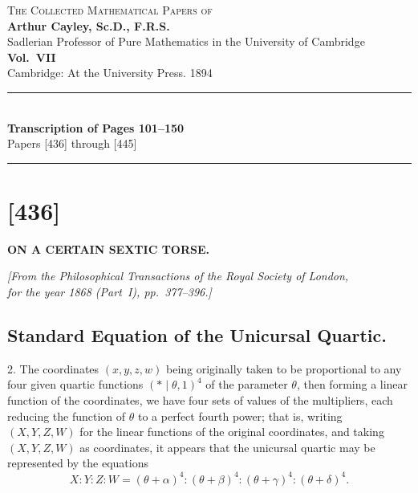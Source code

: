 \documentclass[11pt,a4paper]{article}
\begin{document}
\begin{titlepage}
\begin{center}
\vspace*{2cm}
{\Large\textsc{The Collected Mathematical Papers of}}\\[0.5em]
{\LARGE\textbf{Arthur Cayley, Sc.D., F.R.S.}}\\[0.3em]
{\large Sadlerian Professor of Pure Mathematics in the University of Cambridge}\\[2cm]
{\Huge\textbf{Vol.\ VII}}\\[1cm]
{\large Cambridge: At the University Press. 1894}\\[2cm]
\rule{\textwidth}{0.4pt}\\[1cm]
{\Large\textbf{Transcription of Pages 101--150}}\\[0.5em]
{\normalsize Papers [436] through [445]}\\[1cm]
\rule{\textwidth}{0.4pt}
\end{center}
\end{titlepage}

\tableofcontents
\newpage

\section*{[436]}

\begin{center}
\textbf{\Large ON A CERTAIN SEXTIC TORSE.}
\end{center}

\begin{flushright}
\textit{[From the Philosophical Transactions of the Royal Society of London,}\\
\textit{for the year 1868 (Part\ I), pp.\ 377--396.]}
\end{flushright}

\vspace{1em}

\subsection*{Standard Equation of the Unicursal Quartic.}

2. The coordinates $(x, y, z, w)$ being originally taken to be proportional to any four given quartic functions $(\ast\mid\theta, 1)^4$ of the parameter $\theta$, then forming a linear function of the coordinates, we have four sets of values of the multipliers, each reducing the function of $\theta$ to a perfect fourth power; that is, writing $(X, Y, Z, W)$ for the linear functions of the original coordinates, and taking $(X, Y, Z, W)$ as coordinates, it appears that the unicursal quartic may be represented by the equations
\[
X : Y : Z : W = (\theta + \alpha)^4 : (\theta + \beta)^4 : (\theta + \gamma)^4 : (\theta + \delta)^4.
\]
\end{document}

